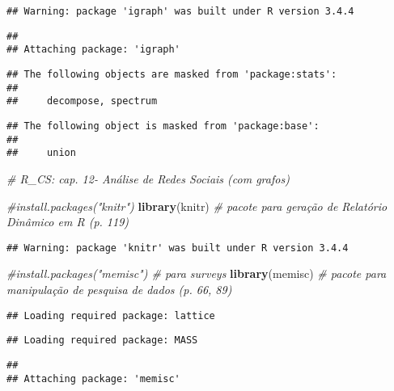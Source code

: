 \documentclass[]{article}
\newenvironment{Shaded}{\begin{snugshade}}{\end{snugshade}}
\newcommand{\KeywordTok}[1]{\textcolor[rgb]{0.13,0.29,0.53}{\textbf{#1}}}
\newcommand{\CommentTok}[1]{\textcolor[rgb]{0.56,0.35,0.01}{\textit{#1}}}
\newcommand{\NormalTok}[1]{#1}
\begin{document}
\begin{verbatim}
## Warning: package 'igraph' was built under R version 3.4.4
\end{verbatim}

\begin{verbatim}
## 
## Attaching package: 'igraph'
\end{verbatim}

\begin{verbatim}
## The following objects are masked from 'package:stats':
## 
##     decompose, spectrum
\end{verbatim}

\begin{verbatim}
## The following object is masked from 'package:base':
## 
##     union
\end{verbatim}

\begin{Shaded}
\begin{Highlighting}[]
                \CommentTok{# R_CS: cap. 12- Análise de Redes Sociais (com grafos)}

\CommentTok{#install.packages("knitr")}
\KeywordTok{library}\NormalTok{(knitr) }\CommentTok{# pacote para geração de Relatório Dinâmico em R (p. 119)}
\end{Highlighting}
\end{Shaded}

\begin{verbatim}
## Warning: package 'knitr' was built under R version 3.4.4
\end{verbatim}

\begin{Shaded}
\begin{Highlighting}[]
\CommentTok{#install.packages("memisc") # para surveys}
\KeywordTok{library}\NormalTok{(memisc) }\CommentTok{# pacote para manipulação de pesquisa de dados (p. 66, 89)}
\end{Highlighting}
\end{Shaded}

\begin{verbatim}
## Loading required package: lattice
\end{verbatim}

\begin{verbatim}
## Loading required package: MASS
\end{verbatim}

\begin{verbatim}
## 
## Attaching package: 'memisc'
\end{verbatim}
\end{document}
